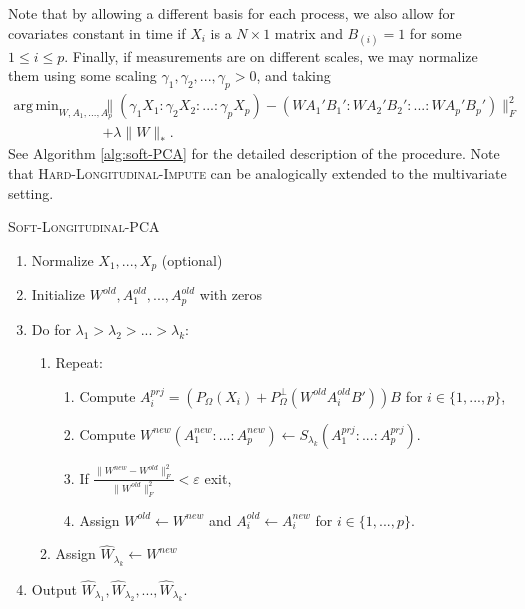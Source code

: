\documentclass[preprint]{imsart}
\numberwithin{equation}{section}
\theoremstyle{plain}
\DeclareMathOperator*{\argmin}{arg\,min}
\begin{document}
Note that by allowing a different basis for each process, we also allow for covariates constant in time if $X_i$ is a $N\times 1$ matrix and $B_{(i)} = 1$ for some $1 \leq i \leq p$.
Finally, if measurements are on different scales, we may normalize them using some scaling $\gamma_1, \gamma_2,..., \gamma_p > 0$, and taking
\begin{align*}%
\argmin_{W,A_1,...,A_p} &\| (\gamma_1 X_{1}:\gamma_2 X_{2}:...:\gamma_p X_{p}) - (WA_1'B_1':WA_2'B_2':...:WA_p'B_p') \|_F^2\\ &+ \lambda\|W\|_*.
\end{align*}
See Algorithm \ref{alg:soft-PCA} for the detailed description of the procedure. Note that \textsc{Hard-Longitudinal-Impute} can be analogically extended to the multivariate setting. %

\begin{algorithm}
\caption{\textsc{Soft-Longitudinal-PCA}\label{alg:soft-PCA}}
\begin{enumerate}
\item Normalize $X_1,...,X_p$ (optional)
\item Initialize $W^{old},A^{old}_1,...,A^{old}_p$ with zeros
\item Do for $\lambda_1 > \lambda_2 > ... > \lambda_k$:
\begin{enumerate}
\item Repeat:
\begin{enumerate}
\item Compute $A^{prj}_i = (P_\Omega(X_i) + P_\Omega^\perp(W^{old}A_i^{old}B'))B$ for $i \in \{1,...,p\}$,
\item Compute $W^{new} (A_1^{new}:...:A_p^{new}) \leftarrow S_{\lambda_k}( A^{prj}_1 : ... : A^{prj}_p )$.
\item If $\frac{\|W^{new} - W^{old}\|_F^2}{\|W^{old}\|_F^2} < \varepsilon$ exit,
\item Assign $W^{old} \leftarrow W^{new}$ and $A_i^{old} \leftarrow A_i^{new}$ for $i \in \{1,...,p\}$.
\end{enumerate}
\item Assign $\hat{W}_{\lambda_k} \leftarrow W^{new}$
\end{enumerate}
\item Output $\hat{W}_{\lambda_1}, \hat{W}_{\lambda_2}, ... , \hat{W}_{\lambda_k}$.
\end{enumerate}
\end{algorithm}
\end{document}
